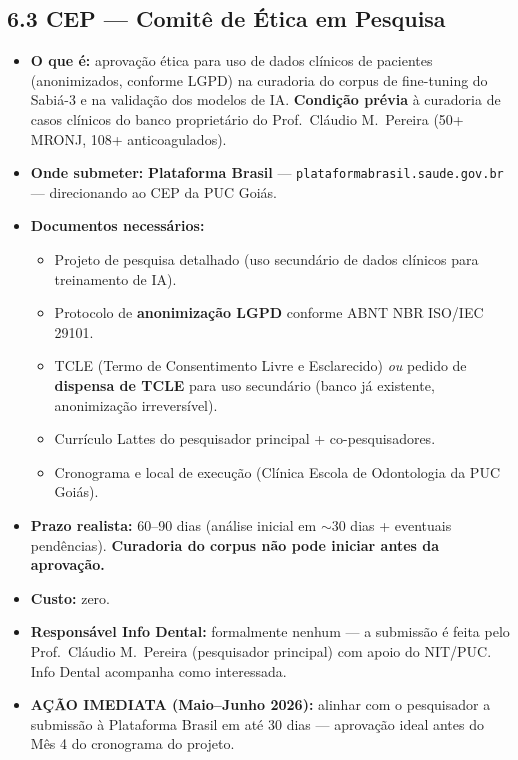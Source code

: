 \documentclass[11pt, a4paper]{article}
\begin{document}
\subsection{6.3 CEP --- Comitê de Ética em Pesquisa}

\begin{itemize}[label=\textcolor{primaryColor}{$\blacktriangleright$}, leftmargin=1.6em]
    \item \textbf{O que é:} aprovação ética para uso de dados clínicos de pacientes (anonimizados, conforme LGPD) na curadoria do corpus de fine-tuning do Sabiá-3 e na validação dos modelos de IA. \textbf{Condição prévia} à curadoria de casos clínicos do banco proprietário do Prof.\ Cláudio M.\ Pereira (50+ MRONJ, 108+ anticoagulados).
    \item \textbf{Onde submeter:} \textbf{Plataforma Brasil} --- \texttt{plataformabrasil.saude.gov.br} --- direcionando ao CEP da PUC Goiás.
    \item \textbf{Documentos necessários:}
    \begin{itemize}[label=$\circ$, leftmargin=1.4em]
        \item Projeto de pesquisa detalhado (uso secundário de dados clínicos para treinamento de IA).
        \item Protocolo de \textbf{anonimização LGPD} conforme ABNT NBR ISO/IEC 29101.
        \item TCLE (Termo de Consentimento Livre e Esclarecido) \emph{ou} pedido de \textbf{dispensa de TCLE} para uso secundário (banco já existente, anonimização irreversível).
        \item Currículo Lattes do pesquisador principal + co-pesquisadores.
        \item Cronograma e local de execução (Clínica Escola de Odontologia da PUC Goiás).
    \end{itemize}
    \item \textbf{Prazo realista:} 60--90 dias (análise inicial em $\sim$30 dias + eventuais pendências). \textbf{Curadoria do corpus não pode iniciar antes da aprovação.}
    \item \textbf{Custo:} zero.
    \item \textbf{Responsável Info Dental:} formalmente nenhum --- a submissão é feita pelo Prof.\ Cláudio M.\ Pereira (pesquisador principal) com apoio do NIT/PUC. Info Dental acompanha como interessada.
    \item \textcolor{accentColor}{\textbf{AÇÃO IMEDIATA (Maio--Junho 2026):}} alinhar com o pesquisador a submissão à Plataforma Brasil em até 30 dias --- aprovação ideal antes do Mês 4 do cronograma do projeto.
\end{itemize}
\end{document}
